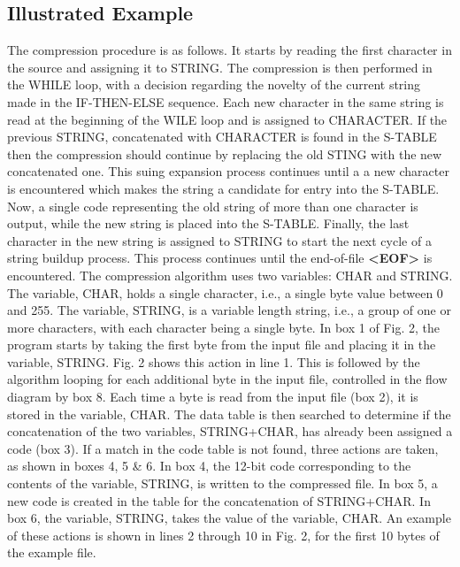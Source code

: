 \documentclass[12pt, a4paper]{article}
\begin{document}
 \subsection{Illustrated Example}
 The compression procedure is as follows. It starts by
reading the first character in the source and assigning it to
STRING. The compression is then performed in the WHILE loop,
with a decision regarding the novelty of the current string made in the
IF-THEN-ELSE sequence. Each new character in the same string
is read at the beginning of the WILE loop and is assigned to
CHARACTER. If the previous STRING, concatenated with
CHARACTER is found in the S-TABLE then the compression
should continue by replacing the old STING with the new
concatenated one. This suing expansion process continues until a
a new character is encountered which makes the string a candidate for
entry into the S-TABLE. Now, a single code representing the old string of more than one character is output, while the new string is
placed into the S-TABLE. Finally, the last character in the new
string is assigned to STRING to start the next cycle of a string
buildup process. This process continues until the end-of-file
\textbf{\textless EOF\textgreater
} is encountered. \cite{kinsner1991lempel}
The compression algorithm uses two variables: CHAR and STRING. The variable, CHAR, holds a single character, i.e., a single byte value between 0 and 255. The variable, STRING, is a variable length string, i.e., a group of one or more characters, with each character being a single byte. In box 1 of Fig. 2, the program starts by taking the first byte from the input file and placing it in the variable, STRING. Fig. 2 shows this action in line 1. This is followed by the algorithm looping for each additional byte in the input file, controlled in the flow diagram by box 8. Each time a byte is read from the input file (box 2), it is stored in the variable, CHAR. The data table is then searched to determine if the concatenation of the two variables, STRING+CHAR, has already been assigned a code (box 3). If a match in the code table is not found, three actions are taken, as shown in boxes 4, 5 \& 6. In box 4, the 12-bit code corresponding to the contents of the variable, STRING, is written to the compressed file. In box 5, a new code is created in the table for the concatenation of STRING+CHAR. In box 6, the variable, STRING, takes the value of the variable, CHAR. An example of these actions is shown in lines 2 through 10 in Fig. 2, for the first 10 bytes of the example file.
\end{document}
